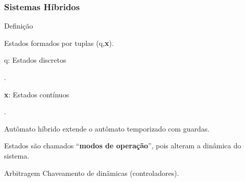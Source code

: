 \documentclass[hyperref={pdfpagelabels=false},table]{beamer}
\newcommand{\subitem}[1]{
    {\setlength\itemindent{30pt} \item[$\rightarrow$] #1}
}
\begin{document}
\begin{frame}
	\frametitle{Sistemas Híbridos}
	\begin{block}{Definição}
		\begin{itemize}
		  \item Estados formados por tuplas (q,\textbf{x}).
		  \subitem{q: Estados discretos}.
		  \subitem{\textbf{x}: Estados contínuos}.
		  \item Autômato híbrido extende o autômato temporizado com guardas.
		  \item Estados são chamados ``\textbf{modos de operação}'', pois alteram a
		  dinâmica do sistema.
		\end{itemize}
	\end{block}
	\pause
	\begin{exampleblock}{Arbitragem}
		Chaveamento de dinâmicas (controladores).
	\end{exampleblock}
\end{frame}

\begin{frame}
	
\end{frame}
\end{document}
